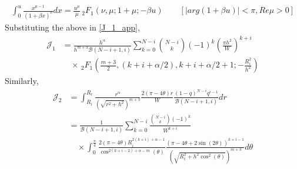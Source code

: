 \documentclass{beamer}
\providecommand{\sbrak}[1]{\ensuremath{{}\left[#1\right]}}
\providecommand{\brak}[1]{\ensuremath{\left(#1\right)}}
\theoremstyle{remark}
\providecommand{\abs}[1]{\left\vert#1\right\vert}
\begin{document}
\begin{frame}
\footnotesize{
   \begin{align}
\int_{0}^{u}\frac{x^{\mu-1}}{\brak{1+\beta x}^{\nu}}dx=\frac{u^{\mu}}{\mu}  \,_2F_1\brak{\nu,\mu;1+\mu;-\beta u}
\qquad \sbrak{\abs{arg\brak{1+\beta u}} < \pi, Re\mu>0}
\end{align}
}
%
Substituting the above in \eqref{J_1_app},
 \begin{align}
    \mathcal{J}_1& = \frac{h^{\alpha}}{h^{m+3}\mathcal{B}\brak{N-i+1,i}}\sum_{k=0}^{N-i}\binom{N-i}{k}(-1)^k\brak{\frac{\pi h^2}{W}}^{k+i}
   \nonumber \\
   &\quad \times \,_2F_1\brak{\frac{m+3}{2},\brak{k+i+\alpha/2},k+i+\alpha/2+1;-\frac{R_i^2}{h^2}} 
   \end{align}
   Similarly, 
    \begin{align}
   \mathcal{J}_2 & = \int_{R_i}^{R_c}\frac{r^{\alpha}}{\brak{\sqrt{r^2+h^2}}^{m+3}}\frac{2\brak{\pi-4\theta} r}{W}\frac{\brak{1-q}^{N-i}q^{i-1}}{\mathcal{B}\brak{N-i+1,i}}dr \nonumber \\
   & = \frac{1}{\mathcal{B}\brak{N-i+1,i}}\sum_{k=0}^{N-i}\frac{\binom{N-i}{k}(-1)^k}{W^{k+i}}
  \nonumber \\
  & \quad \times   \int_{0}^{\frac{\pi}{4}} \frac{2\brak{\pi-4\theta}R_i^{2\brak{k+i}+\alpha-1}}{\cos^{2\brak{k+i-2}+\alpha-m}\brak{\theta}}
   \frac{\brak{\pi -4\theta+2\sin\brak{2\theta}}^{k+i-1}}{\brak{\sqrt{R_i^2+h^2\cos^2\brak{\theta}}}^{m+3}} d\theta
      \end{align}
\end{frame}
\end{document}
